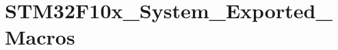 \hypertarget{group___s_t_m32_f10x___system___exported___macros}{}\section{S\+T\+M32\+F10x\+\_\+\+System\+\_\+\+Exported\+\_\+\+Macros}
\label{group___s_t_m32_f10x___system___exported___macros}
